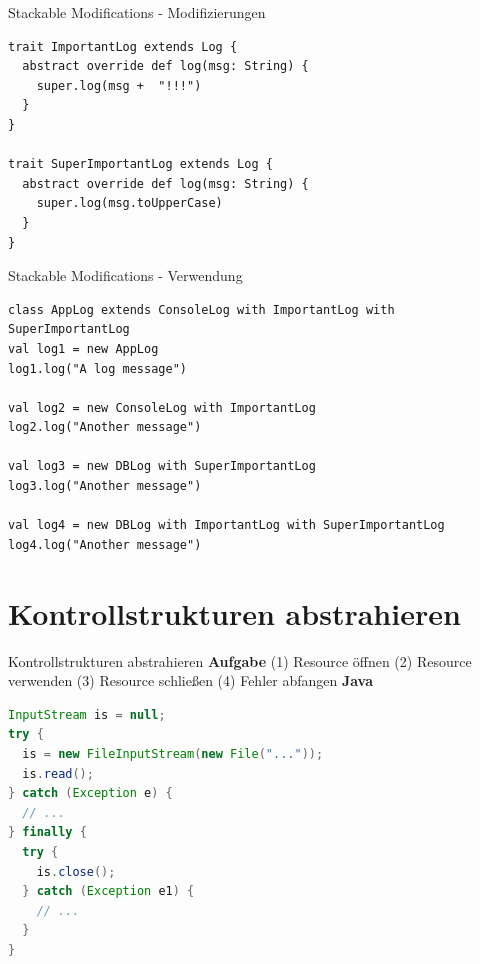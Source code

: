 \documentclass{beamer}
\begin{document}
\begin{frame}[fragile]{Stackable Modifications - Modifizierungen}
\begin{lstlisting}
trait ImportantLog extends Log {
  abstract override def log(msg: String) {
    super.log(msg +  "!!!")
  }
}

trait SuperImportantLog extends Log {
  abstract override def log(msg: String) {
    super.log(msg.toUpperCase)
  }
}
\end{lstlisting}
\end{frame}


\begin{frame}[fragile]{Stackable Modifications - Verwendung}
\begin{lstlisting}
class AppLog extends ConsoleLog with ImportantLog with SuperImportantLog
val log1 = new AppLog
log1.log("A log message")

val log2 = new ConsoleLog with ImportantLog
log2.log("Another message")

val log3 = new DBLog with SuperImportantLog
log3.log("Another message")

val log4 = new DBLog with ImportantLog with SuperImportantLog
log4.log("Another message")
\end{lstlisting}
\end{frame}


\section{Kontrollstrukturen abstrahieren}


\begin{frame}[fragile]{Kontrollstrukturen abstrahieren}
\center \textbf{Aufgabe} \linebreak	
(1) Resource öffnen (2) Resource verwenden \linebreak (3) Resource schließen (4) Fehler abfangen
\center \textbf{Java}
\begin{lstlisting}[language=java]
InputStream is = null;
try {
  is = new FileInputStream(new File("..."));
  is.read();
} catch (Exception e) {
  // ...
} finally {
  try {
    is.close();
  } catch (Exception e1) {
    // ...
  }
}
\end{lstlisting}
\end{frame}  
\end{document}
